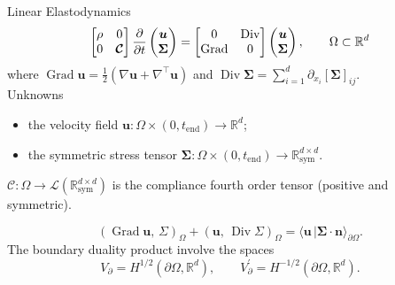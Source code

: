\documentclass[aspectratio=169]{beamer}
\DeclareMathOperator*{\Grad}{Grad}
\DeclareMathOperator*{\Div}{Div}
\newcommand{\bbR}{\mathbb{R}}
\newcommand{\inner}[3][]{\ensuremath{( #2, \, #3 )_{#1}}}
\newcommand{\dualpr}[3][]{\ensuremath{\langle #2 \, \vert #3 \rangle_{#1}}}
\begin{document}
\begin{frame}{Linear Elastodynamics}
	\begin{equation*}
		\begin{bmatrix}
			\rho & 0 \\
			0 & \bm{\mathcal{C}}
		\end{bmatrix}\diffp{}{t}\begin{pmatrix}
			\bm{u} \\ \bm{\Sigma} 
		\end{pmatrix} = 
		\begin{bmatrix}
			0 & \Div \\
			\Grad & 0 \\
		\end{bmatrix}\begin{pmatrix}
			\bm{u} \\ \bm{\Sigma}
		\end{pmatrix}, \qquad \Omega \subset \bbR^d
	\end{equation*}
where $\Grad\bm{u}=\frac{1}{2}(\nabla \bm{u} + \nabla^\top \bm{u})$ and $\Div \bm{\Sigma}= \sum_{i=1}^d \partial_{x_i} [\bm\Sigma]_{ij}$.\\

	Unknowns 
	\begin{itemize}
		\item the velocity field $\bm{u} : \Omega \times (0, t_{\mathrm{end}}) \rightarrow \bbR^d$;
		\item the symmetric stress tensor $\bm{\Sigma} : \Omega \times (0, t_{\mathrm{end}}) \rightarrow \bbR^{d\times d}_{\text{sym}}$.
	\end{itemize}
	 $\bm{\mathcal{C}}: \Omega \rightarrow \mathcal{L}(\bbR^{d\times d}_{\text{sym}})$ is the compliance fourth order tensor (positive and symmetric). 
	 
	\begin{equation*}
		\inner[\Omega]{\Grad \bm{u}}{\Sigma} + \inner[\Omega]{\bm{u}}{\Div \Sigma} = \dualpr[\partial\Omega]{\bm{u}}{\bm{\Sigma} \cdot \bm{n}}.
	\end{equation*}
	The boundary duality product involve the spaces
	\begin{equation*}
			V_\partial = H^{1/2}(\partial\Omega, \bbR^d), \qquad  V_\partial^{'} = H^{-1/2}(\partial\Omega, \bbR^d).
	\end{equation*}
\end{frame}
\end{document}
